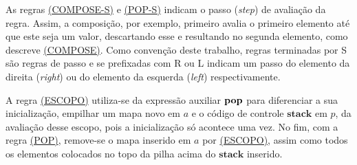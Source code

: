 As regras \hyperref[rule:pop-s]{(COMPOSE-S)} e \hyperref[rule:compose-s]{(POP-S)} indicam o passo (\emph{step}) de avaliação da regra. Assim, a composição, por exemplo, primeiro avalia o primeiro elemento até que este seja um valor, descartando esse e resultando no segunda elemento, como descreve \hyperref[rule:compose]{(COMPOSE)}. Como convenção deste trabalho, regras terminadas por S são regras de passo e se prefixadas com R ou L indicam um passo do elemento da direita (\emph{right}) ou do elemento da esquerda (\emph{left}) respectivamente.

A regra \hyperref[rule:escopo]{(ESCOPO)} utiliza-se da expressão auxiliar $\mathbf{pop}$ para diferenciar a sua inicialização, empilhar um mapa novo em $a$ e o código de controle $\mathbf{stack}$ em $p$, da avaliação desse escopo, pois a inicialização só acontece uma vez. No fim, com a regra \hyperref[rule:pop]{(POP)}, remove-se o mapa inserido em $a$ por \hyperref[rule:escopo]{(ESCOPO)}, assim como todos os elementos colocados no topo da pilha acima do $\mathbf{stack}$ inserido.





    

